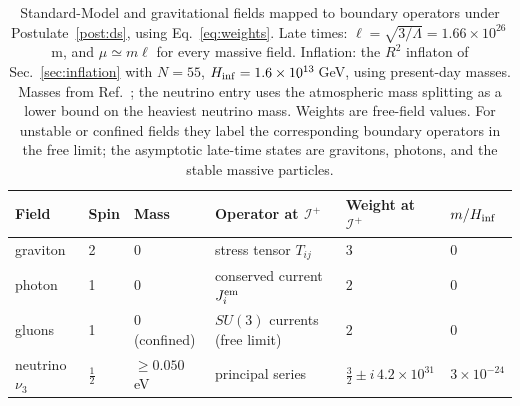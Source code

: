 \documentclass[reprint,aps,prd,amsmath,amssymb,superscriptaddress,nofootinbib,floatfix]{revtex4-2}
\theoremstyle{plain}
\theoremstyle{definition}
\theoremstyle{remark}
\begin{document}
\begin{table}[t]
\caption{\label{tab:sm}Standard-Model and gravitational fields mapped to boundary operators under
Postulate~\ref{post:ds}, using Eq.~\eqref{eq:weights}. Late times: $\ell=\sqrt{3/\Lambda}=1.66\times10^{26}$\,m, and $\mu\simeq m\ell$ for every
massive field. Inflation: the $R^2$ inflaton of Sec.~\ref{sec:inflation} with $N=55$, $H_{\rm inf}=1.6\times10^{13}$\,GeV, using
present-day masses. Masses from Ref.~\cite{PDG2024}; the neutrino entry uses the atmospheric mass splitting as a
lower bound on the heaviest neutrino mass. Weights are free-field values. For unstable or confined fields they
label the corresponding boundary operators in the free limit; the asymptotic late-time states are gravitons,
photons, and the stable massive particles.}
\begin{ruledtabular}
\begin{tabular}{llllll}
\parbox[t]{0.17\textwidth}{\raggedright Field\strut} & \parbox[t]{0.05\textwidth}{\raggedright Spin\strut} & \parbox[t]{0.14\textwidth}{\raggedright Mass\strut} & \parbox[t]{0.25\textwidth}{\raggedright Operator at $\mathcal{I}^+$\strut} & \parbox[t]{0.18\textwidth}{\raggedright Weight at $\mathcal{I}^+$\strut} & \parbox[t]{0.11\textwidth}{\raggedright $m/H_{\rm inf}$\strut} \\
\hline
\parbox[t]{0.17\textwidth}{\raggedright graviton\strut} & \parbox[t]{0.05\textwidth}{\raggedright 2\strut} & \parbox[t]{0.14\textwidth}{\raggedright 0\strut} & \parbox[t]{0.25\textwidth}{\raggedright stress tensor $T_{ij}$\strut} & \parbox[t]{0.18\textwidth}{\raggedright $3$\strut} & \parbox[t]{0.11\textwidth}{\raggedright $0$\strut} \\
\parbox[t]{0.17\textwidth}{\raggedright photon\strut} & \parbox[t]{0.05\textwidth}{\raggedright 1\strut} & \parbox[t]{0.14\textwidth}{\raggedright 0\strut} & \parbox[t]{0.25\textwidth}{\raggedright conserved current $J_i^{\rm em}$\strut} & \parbox[t]{0.18\textwidth}{\raggedright $2$\strut} & \parbox[t]{0.11\textwidth}{\raggedright $0$\strut} \\
\parbox[t]{0.17\textwidth}{\raggedright gluons\strut} & \parbox[t]{0.05\textwidth}{\raggedright 1\strut} & \parbox[t]{0.14\textwidth}{\raggedright 0 (confined)\strut} & \parbox[t]{0.25\textwidth}{\raggedright $SU(3)$ currents (free limit)\strut} & \parbox[t]{0.18\textwidth}{\raggedright $2$\strut} & \parbox[t]{0.11\textwidth}{\raggedright $0$\strut} \\
\parbox[t]{0.17\textwidth}{\raggedright neutrino $\nu_3$\strut} & \parbox[t]{0.05\textwidth}{\raggedright $\tfrac12$\strut} & \parbox[t]{0.14\textwidth}{\raggedright $\geq0.050$\,eV\strut} & \parbox[t]{0.25\textwidth}{\raggedright principal series\strut} & \parbox[t]{0.18\textwidth}{\raggedright $\tfrac32\pm i\,4.2\times10^{31}$\strut} & \parbox[t]{0.11\textwidth}{\raggedright $3\times10^{-24}$\strut} \\

\end{tabular}
\end{ruledtabular}
\end{table}
\end{document}
